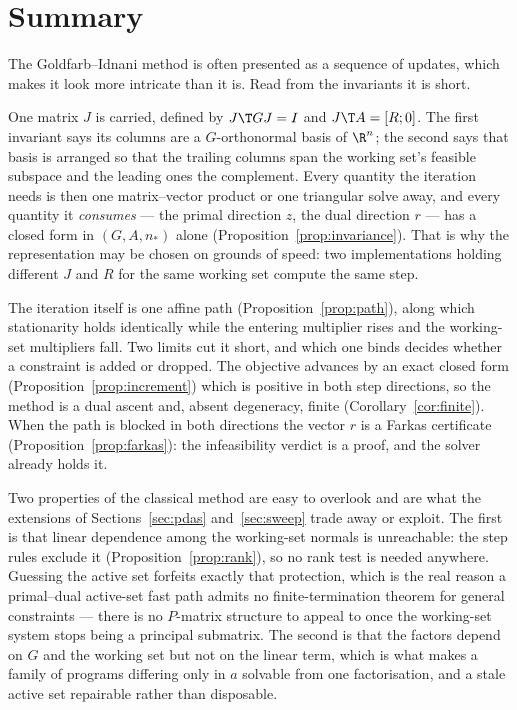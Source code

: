 \section{Summary}
\label{sec:conclusions}

The Goldfarb--Idnani method is often presented as a sequence of updates, which
makes it look more intricate than it is. Read from the invariants it is short.

One matrix $J$ is carried, defined by $J\T G J = I$ and $J\T A = [R;0]$. The first
invariant says its columns are a $G$-orthonormal basis of $\R^n$; the second says
that basis is arranged so that the trailing columns span the working set's
feasible subspace and the leading ones the complement. Every quantity the
iteration needs is then one matrix--vector product or one triangular solve away,
and every quantity it \emph{consumes} --- the primal direction $z$, the dual
direction $r$ --- has a closed form in $(G, A, n_*)$ alone
(Proposition~\ref{prop:invariance}). That is why the representation may be chosen
on grounds of speed: two implementations holding different $J$ and $R$ for the same
working set compute the same step.

The iteration itself is one affine path (Proposition~\ref{prop:path}), along which
stationarity holds identically while the entering multiplier rises and the
working-set multipliers fall. Two limits cut it short, and which one binds decides
whether a constraint is added or dropped. The objective advances by an exact
closed form (Proposition~\ref{prop:increment}) which is positive in both step
directions, so the method is a dual ascent and, absent degeneracy, finite
(Corollary~\ref{cor:finite}). When the path is blocked in both directions the
vector $r$ is a Farkas certificate (Proposition~\ref{prop:farkas}): the
infeasibility verdict is a proof, and the solver already holds it.

Two properties of the classical method are easy to overlook and are what the
extensions of Sections~\ref{sec:pdas} and~\ref{sec:sweep} trade away or exploit.
The first is that linear dependence among the working-set normals is unreachable:
the step rules exclude it (Proposition~\ref{prop:rank}), so no rank test is
needed anywhere. Guessing the active set forfeits exactly that protection, which
is the real reason a primal--dual active-set fast path admits no
finite-termination theorem for general constraints --- there is no $P$-matrix
structure to appeal to once the working-set system stops being a principal
submatrix. The second is that the factors depend on $G$ and the working set but
not on the linear term, which is what makes a family of programs differing only in
$a$ solvable from one factorisation, and a stale active set repairable rather than
disposable.


